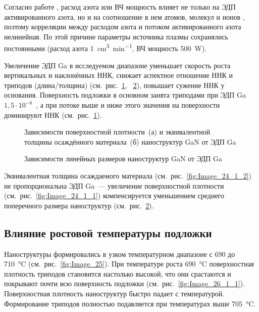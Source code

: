 Согласно работе \cite{Voulot1998}, расход азота или ВЧ мощность влияет не
только на ЭДП активированного азота, но и на соотношение в нем атомов, молекул
и ионов \cite{Blant2000}, поэтому корреляции между расходом азота и потоком
активированного азота нелинейная. По этой причине параметры источника плазмы
сохранялись постоянными (расход азота 1~\si{\centi\meter^3\per\minute}, ВЧ
мощность 500~\si{\watt}).

Увеличение ЭДП Ga в исследуемом диапазоне уменьшает скорость роста вертикальных
и наклонённых ННК, снижает аспектное отношение ННК и триподов (длина/толщина)
(см.~рис.~\cref{fig:Image_24_1},~ \cref{fig:Image_24_2}), повышает сужение ННК
у основания. Поверхность подложки в основном занята триподами при ЭДП Ga \(1,5
\cdot 10^{-8}\)~\si{\torr}, а при потоке выше и ниже этого значения на
поверхности доминируют ННК (см.~рис.~\cref{fig:Image_24_1}).

\begin{figure}[ht] 
			\caption{Зависимости поверхностной плотности~(а) и эквивалентной толщины
			осаждённого материала~(б) наноструктур GaN от ЭДП
		Ga}\label{fig:Image_24_1} \end{figure}

\begin{figure}[ht]  \caption{Зависимости
линейных размеров наноструктур GaN от ЭДП Ga}\label{fig:Image_24_2}
\end{figure}

Эквивалентная толщина осаждаемого материала (см.~рис.~\cref{fig:Image_24_1_2})
не пропорциональна ЭДП Ga~--- увеличение поверхностной плотности
(см.~рис.~\cref{fig:Image_24_1_1}) компенсируется уменьшением среднего
поперечного размера наноструктур (см.~рис.~\cref{fig:Image_24_2}).

\subsection{Влияние ростовой температуры подложки}\label{subsec:ch3/sec6/sub3}

Наноструктуры формировались в узком температурном диапазоне с 690 до
710~\si{\degreeCelsius} (см.~рис.~\cref{fig:Image_25}). При температуре роста
690~\si{\degreeCelsius} поверхностная плотность триподов становится настолько
высокой, что они срастаются и покрывают почти всю поверхность подложки
(см.~рис.~\cref{fig:Image_26_1_1}). Поверхностная плотность наноструктур быстро
падает с температурой. Формирование триподов полностью подавляется при
температурах выше 705~\si{\degreeCelsius}.

